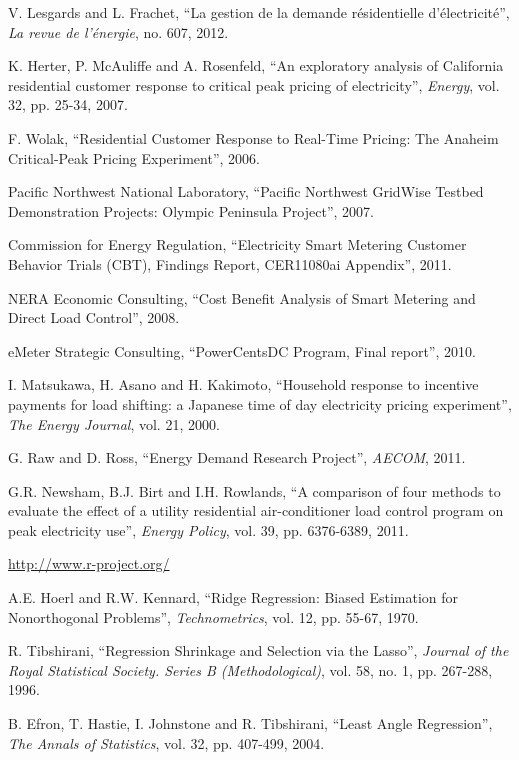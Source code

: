 \documentclass[journal]{IEEEtran}
\begin{document}
\begin{thebibliography}{1}
V. Lesgards and L. Frachet, ``La gestion de la demande r\'{e}sidentielle d'\'{e}lectricit\'{e}'', \emph{La revue de l'\'{e}nergie}, no. 607, 2012.

K. Herter, P. McAuliffe and A. Rosenfeld, ``An exploratory analysis of {C}alifornia residential customer response to critical peak pricing of electricity'', \emph{Energy}, vol. 32, pp. 25-34, 2007.

F. Wolak, ``Residential Customer Response to Real-Time Pricing: The Anaheim Critical-Peak Pricing Experiment'', 2006.

Pacific Northwest National Laboratory, ``Pacific Northwest GridWise Testbed Demonstration Projects: Olympic Peninsula Project'', 2007.

Commission for Energy Regulation, ``Electricity Smart Metering Customer Behavior Trials (CBT), Findings Report, CER11080ai Appendix'', 2011.

NERA Economic Consulting, ``Cost Benefit Analysis of Smart Metering and Direct Load Control'', 2008.

eMeter Strategic Consulting, ``PowerCentsDC Program, Final report'', 2010.

I. Matsukawa, H. Asano and H. Kakimoto, ``Household response to incentive payments for load shifting: a Japanese time of day electricity pricing experiment'', \emph{The Energy Journal}, vol. 21, 2000.

G. Raw and D. Ross, ``Energy Demand Research Project'', \emph{AECOM}, 2011.

G.R. Newsham, B.J. Birt and I.H. Rowlands, ``A comparison of four methods to evaluate the effect of a utility residential air-conditioner load control program on peak electricity use'', \emph{Energy Policy}, vol. 39, pp. 6376-6389, 2011.

\url{http://www.r-project.org/}

A.E. Hoerl and R.W. Kennard, ``Ridge Regression: Biased Estimation for Nonorthogonal Problems'', \emph{Technometrics}, vol. 12, pp. 55-67, 1970.

R. Tibshirani, ``Regression Shrinkage and Selection via the Lasso'', \emph{Journal of the Royal Statistical Society. Series B (Methodological)}, vol. 58, no. 1, pp. 267-288, 1996.

B. Efron, T. Hastie, I. Johnstone and R. Tibshirani, ``Least Angle Regression'', \emph{The Annals of Statistics}, vol. 32, pp. 407-499, 2004.


\end{thebibliography}
\end{document}
